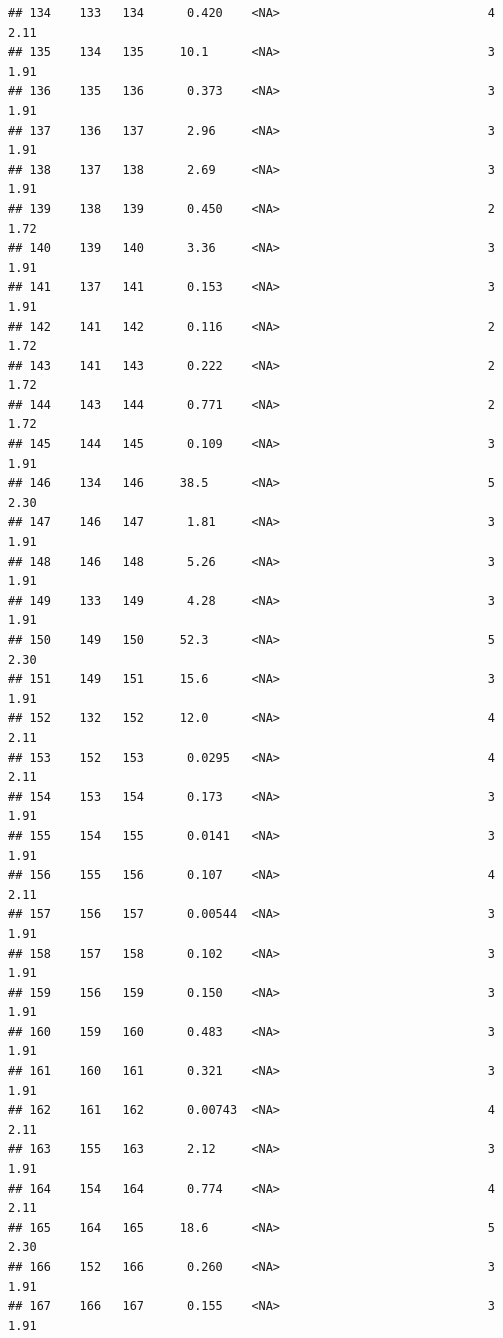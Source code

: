 \documentclass[10pt,letterpaper]{article}
\begin{document}
\begin{verbatim}
## 134    133   134      0.420    <NA>                             4    2.11 
## 135    134   135     10.1      <NA>                             3    1.91 
## 136    135   136      0.373    <NA>                             3    1.91 
## 137    136   137      2.96     <NA>                             3    1.91 
## 138    137   138      2.69     <NA>                             3    1.91 
## 139    138   139      0.450    <NA>                             2    1.72 
## 140    139   140      3.36     <NA>                             3    1.91 
## 141    137   141      0.153    <NA>                             3    1.91 
## 142    141   142      0.116    <NA>                             2    1.72 
## 143    141   143      0.222    <NA>                             2    1.72 
## 144    143   144      0.771    <NA>                             2    1.72 
## 145    144   145      0.109    <NA>                             3    1.91 
## 146    134   146     38.5      <NA>                             5    2.30 
## 147    146   147      1.81     <NA>                             3    1.91 
## 148    146   148      5.26     <NA>                             3    1.91 
## 149    133   149      4.28     <NA>                             3    1.91 
## 150    149   150     52.3      <NA>                             5    2.30 
## 151    149   151     15.6      <NA>                             3    1.91 
## 152    132   152     12.0      <NA>                             4    2.11 
## 153    152   153      0.0295   <NA>                             4    2.11 
## 154    153   154      0.173    <NA>                             3    1.91 
## 155    154   155      0.0141   <NA>                             3    1.91 
## 156    155   156      0.107    <NA>                             4    2.11 
## 157    156   157      0.00544  <NA>                             3    1.91 
## 158    157   158      0.102    <NA>                             3    1.91 
## 159    156   159      0.150    <NA>                             3    1.91 
## 160    159   160      0.483    <NA>                             3    1.91 
## 161    160   161      0.321    <NA>                             3    1.91 
## 162    161   162      0.00743  <NA>                             4    2.11 
## 163    155   163      2.12     <NA>                             3    1.91 
## 164    154   164      0.774    <NA>                             4    2.11 
## 165    164   165     18.6      <NA>                             5    2.30 
## 166    152   166      0.260    <NA>                             3    1.91 
## 167    166   167      0.155    <NA>                             3    1.91 

\end{verbatim}
\end{document}
